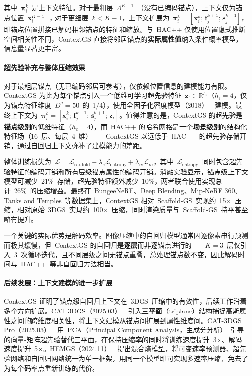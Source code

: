 其中~$\boldsymbol{\pi}_i^k$~是上下文特征。对于最粗层~$\Lambda^{K-1}$~（没有已编码锚点），上下文仅为锚点位置~$\mathbf{x}_i^{K-1}$~；对于更细层~$k < K-1$，上下文扩展为~$\boldsymbol{\pi}_i^k = [\mathbf{x}_i^k;\, \mathbf{f}_j^{k+1};\, \mathbf{s}_j^{k+1}]$，即锚点位置拼接已解码相邻锚点的特征和缩放。与~HAC++ 仅使用位置隐式推断空间相关性不同，ContextGS 直接将邻居锚点的\textbf{实际属性值}纳入条件概率模型，信息量显著更丰富。

\paragraph{超先验补充与整体压缩效果}

对于最粗层锚点（无已编码邻居可参考），仅依赖位置信息的建模能力有限。ContextGS 为此为每个锚点引入一个低维可学习超先验特征~$\mathbf{z}_i \in \mathbb{R}^{h_c}$（$h_c=4$，仅为锚点特征维度~$D^a=50$~的~$1/4$），使用全因子化密度模型（2018）~\cite{balle2018variational}~建模。最终上下文为~$\boldsymbol{\pi}_i^k = [\mathbf{x}_i^k;\, \mathbf{f}_j^{k+1};\, \mathbf{s}_j^{k+1};\, \mathbf{z}_i]$。值得注意的是，ContextGS 的超先验是\textbf{锚点级别}的低维特征（$h_c=4$），而~HAC++ 的哈希网格是一个\textbf{场景级别}的结构化特征场（16~层、每层~4~维）——ContextGS 以远低于~HAC++ 的超先验存储开销，通过自回归上下文弥补了建模能力的差距。

整体训练损失为~$\mathcal{L} = \mathcal{L}_\text{scaffold} + \lambda_e \mathcal{L}_\text{entropy} + \lambda_m \mathcal{L}_m$，其中~$\mathcal{L}_\text{entropy}$~同时包含超先验特征的编码开销和所有层级锚点属性的编码开销。消融实验显示，锚点级上下文模型可减少~21\%~存储，超先验特征额外减少~10\%，两者联合使用实现总计~26\%~的压缩增益。最终在~BungeeNeRF、Deep Blending、Mip-NeRF 360、Tanks and Temples~等数据集上，ContextGS 相对~Scaffold-GS~实现约~15$\times$~压缩，相对原始~3DGS~实现约~100$\times$~压缩，同时渲染质量与~Scaffold-GS~持平甚至略有提升。

一个关键的实际优势是解码效率。图像压缩中的自回归模型通常因逐像素串行预测而极其缓慢，但~ContextGS 的自回归是\textbf{逐层}而非逐锚点进行的——$K=3$~层仅引入~3~次循环迭代，且不同层级之间无锚点重叠，总处理锚点数不变，因此解码时间与~HAC++~等非自回归方法相当。

\paragraph{后续发展：上下文建模的进一步扩展}

ContextGS 证明了锚点级自回归上下文在~3DGS~压缩中的有效性，后续工作沿着多个方向扩展。CAT-3DGS（2025.03）~\cite{2503_00357}~引入\textbf{三平面}（triplane）结构捕捉高斯属性之间的跨维度相关性，将上下文建模从锚点间扩展到属性维度间。CAT-3DGS Pro（2025.03）~\cite{2503_12862}~用~PCA（Principal Component Analysis，主成分分析）~引导的向量-矩阵超先验替代三平面，在保持压缩率的同时将训练速度提升~3$\times$、解码速度提升~5$\times$。HEMGS（2024.11）~\cite{2411_18473}~提出混合熵模型，将可变速率预测器、超先验网络和自回归网络统一为单一框架，用同一个模型即可实现多速率压缩，免去了为每个码率点重新训练的代价。

